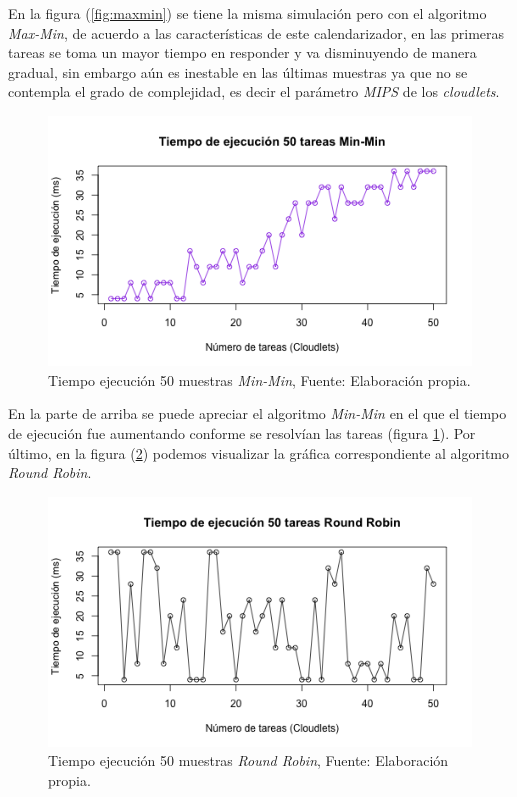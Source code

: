  En la figura (\ref{fig:maxmin}) se tiene la misma simulaci\'on pero con el algoritmo \textit{Max-Min}, de acuerdo a las caracter\'isticas de este calendarizador, en las primeras tareas se toma un mayor tiempo en responder y va disminuyendo de manera gradual, sin embargo a\'un es inestable en las \'ultimas muestras ya que no se contempla el grado de complejidad, es decir el par\'ametro \textit{MIPS} de los \textit{cloudlets}.



\newpage

\renewcommand\thefigure{\arabic{figure}}
\begin{figure}[h!] 
	\centering
	\includegraphics[scale=0.6]{media/minmin}
	\caption{Tiempo ejecuci\'on 50 muestras \textit{Min-Min}, Fuente: Elaboraci\'on propia.}
	\label{fig:minmin}
\end{figure}

En la parte de arriba se puede apreciar el algoritmo \textit{Min-Min} en el que el tiempo de ejecuci\'on fue aumentando conforme se resolv\'ian las tareas (figura \ref{fig:minmin}). Por último, en la figura (\ref{fig:roundrobin}) podemos visualizar la gráfica correspondiente al algoritmo \textit{Round Robin}.


\renewcommand\thefigure{\arabic{figure}}
\begin{figure}[h!] 
	\centering
	\includegraphics[scale=0.6]{media/roundrobin}
	\caption{Tiempo ejecuci\'on 50 muestras \textit{Round Robin}, Fuente: Elaboraci\'on propia.}
	\label{fig:roundrobin}
\end{figure}

